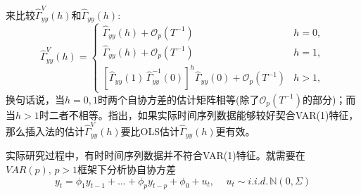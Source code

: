 来比较$\widehat{\Gamma}_{yy}^{V} \left( h \right)$和$\widehat{\Gamma}_{yy} \left( h \right)$:
\begin{equation*}
  \widehat{\Gamma}_{yy}^{V} \left( h \right) =
  \begin{cases}
    \widehat{\Gamma}_{yy} \left( h \right) + \mathcal{O}_{p} \left( T^{-1} \right) & h=0, \\
    \widehat{\Gamma}_{yy} \left( h \right) + \mathcal{O}_{p} \left( T^{-1} \right) & h=1, \\
    \left[ \widehat{\Gamma}_{yy} \left( 1 \right) \,
    \widehat{\Gamma}_{yy}^{-1} \left( 0 \right)
    \right]^{h}
    \widehat{\Gamma}_{yy} \left( 0 \right)
    + \mathcal{O}_{p} \left( T^{-1} \right) & h > 1,
  \end{cases}
\end{equation*}
换句话说，当$h=0,1$时两个自协方差的估计矩阵相等(除了$\mathcal{O}_{p} \left( T^{-1} \right)$的部分)；而当$h>1$时二者不相等。\cite{Schorfheide:2005jg}指出，如果实际时间序列数据能够较好契合VAR(1)特征，那么插入法的估计$\widehat{\Gamma}_{yy}^{V} \left( h \right)$要比OLS估计$\widehat{\Gamma}_{yy} \left( h \right)$更有效。

实际研究过程中，有时时间序列数据并不符合VAR(1)特征。就需要在$VAR(p), \, p >1$框架下分析协自协方差
\begin{equation}
  \label{sec:stylized-ssrep-empirics-varp-def}
  y_{t} = \phi_{1} y_{t-1} + \ldots + \phi_{p} y_{t-p} + \phi_{0} + u_{t}, \quad \, u_{t} \sim i.i.d. \, \mathbb{N} \left( 0, \Sigma \right)
\end{equation}


